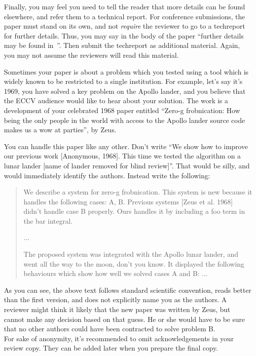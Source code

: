 \documentclass[runningheads]{llncs}
\begin{document}
Finally, you may feel you need to tell the reader that more
details can be found elsewhere, and refer them to a technical
report.  For conference submissions, the paper must stand on its
own, and not {\em require} the reviewer to go to a techreport for
further details.  Thus, you may say in the body of the paper
``further details may be found in~\cite{Authors14b}''.  Then
submit the techreport as additional material. Again, you may not
assume the reviewers will read this material.

Sometimes your paper is about a problem which you tested using a tool which
is widely known to be restricted to a single institution.  For example,
let's say it's 1969, you have solved a key problem on the Apollo lander,
and you believe that the ECCV audience would like to hear about your
solution.  The work is a development of your celebrated 1968 paper entitled
``Zero-g frobnication: How being the only people in the world with access to
the Apollo lander source code makes us a wow at parties'', by Zeus.

You can handle this paper like any other.  Don't write ``We show how to
improve our previous work [Anonymous, 1968].  This time we tested the
algorithm on a lunar lander [name of lander removed for blind review]''.
That would be silly, and would immediately identify the authors. Instead
write the following:
\begin{quotation}
\noindent
   We describe a system for zero-g frobnication.  This
   system is new because it handles the following cases:
   A, B.  Previous systems [Zeus et al. 1968] didn't
   handle case B properly.  Ours handles it by including
   a foo term in the bar integral.

   ...

   The proposed system was integrated with the Apollo
   lunar lander, and went all the way to the moon, don't
   you know.  It displayed the following behaviours
   which show how well we solved cases A and B: ...
\end{quotation}
As you can see, the above text follows standard scientific convention,
reads better than the first version, and does not explicitly name you as
the authors.  A reviewer might think it likely that the new paper was
written by Zeus, but cannot make any decision based on that guess.
He or she would have to be sure that no other authors could have been
contracted to solve problem B. \\

For sake of anonymity, it's recommended to omit acknowledgements
in your review copy. They can be added later when you prepare the final copy.
\end{document}
